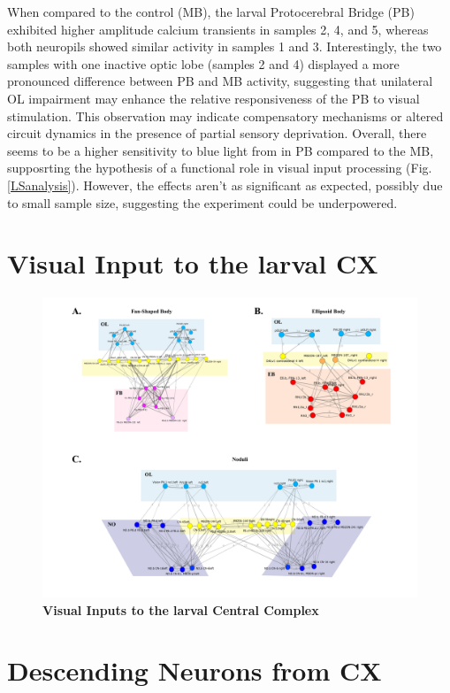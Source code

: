 When compared to the control (MB), the larval Protocerebral Bridge (PB) exhibited higher amplitude calcium transients in samples 2, 4, and 5, whereas both neuropils showed similar activity in samples 1 and 3. Interestingly, the two samples with one inactive optic lobe (samples 2 and 4) displayed a more pronounced difference between PB and MB activity, suggesting that unilateral OL impairment may enhance the relative responsiveness of the PB to visual stimulation. This observation may indicate compensatory mechanisms or altered circuit dynamics in the presence of partial sensory deprivation. 
Overall, there seems to be a higher sensitivity to blue light from in PB compared to the MB, supposrting the hypothesis of a functional role in visual input processing (Fig. \ref{LSanalysis}). However, the effects aren't as significant as expected, possibly due to small sample size, suggesting the experiment could be underpowered.

\section{Visual Input to the larval CX}
\label{CXvisual}
    \begin{figure}
        \centering
        \includegraphics[width=12cm]{Figs/CX/VisualtoCX.pdf}
        \caption[Visual Inputs to larval Central Complex Neuropils]{\textbf{Visual Inputs to the larval Central Complex}}
        \label{visualCXneuropils}
    \end{figure}

\section{Descending Neurons from CX}    

